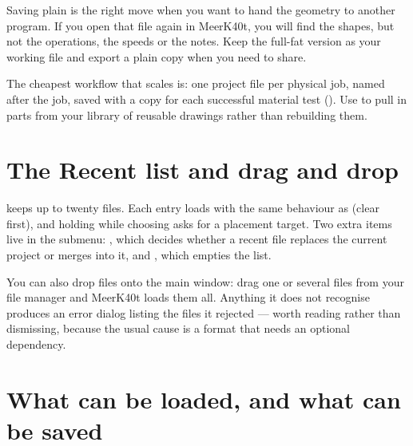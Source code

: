 \begin{warnbox}
Saving plain is the right move when you want to hand the geometry to another
program. If you open that file again in MeerK40t, you will find the shapes, but
not the operations, the speeds or the notes. Keep the full-fat version as your
working file and export a plain copy when you need to share.
\end{warnbox}

\begin{tipbox}
The cheapest workflow that scales is: one project file per physical job, named
after the job, saved with a copy for each successful material test
(). Use  to pull in parts from
your library of reusable drawings rather than rebuilding them.
\end{tipbox}

\section{The Recent list and drag and drop}

 keeps up to twenty files. Each entry loads with the same
behaviour as  (clear first), and holding  while
choosing asks for a placement target. Two extra items live in the submenu:
, which decides whether a recent file replaces the
current project or merges into it, and , which empties the
list.

You can also drop files onto the main window: drag one or several files from your
file manager and MeerK40t loads them all. Anything it does not recognise produces
an error dialog listing the files it rejected --- worth reading rather than
dismissing, because the usual cause is a format that needs an optional dependency.

\section{What can be loaded, and what can be saved}

